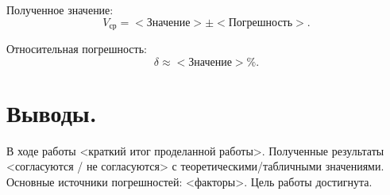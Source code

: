 \documentclass[12pt, a4paper]{article}
\begin{document}
	Полученное значение:
	\[
	V_{\text{ср}} = <\text{Значение}> \pm <\text{Погрешность}>.
	\]
	
	Относительная погрешность:
	\[
	\delta \approx <\text{Значение}>\%.
	\]
	
	\section{Выводы.}
	
	В ходе работы <краткий итог проделанной работы>. Полученные результаты <согласуются / не согласуются> с теоретическими/табличными значениями. Основные источники погрешностей: <факторы>. Цель работы достигнута.
	
\end{document}
